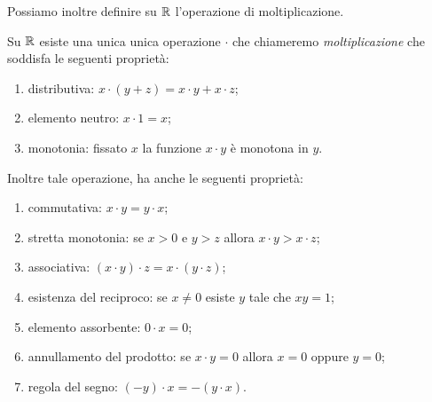 Possiamo inoltre definire su ${\mathbb R}$ l'operazione di moltiplicazione.
%
\begin{theorem}[moltiplicazione]
Su ${\mathbb R}$ esiste una unica unica operazione $\cdot$ che chiameremo 
\emph{moltiplicazione}%
%
 che soddisfa le seguenti 
proprietà: 
\begin{enumerate}
  \item distributiva: $x\cdot(y+z) = x\cdot y + x\cdot z$;
  \item elemento neutro: $x\cdot 1 = x$;
  \item monotonia: fissato $x$ la funzione $x\cdot y$ è monotona in $y$.  
\end{enumerate}
  Inoltre tale operazione,
  ha anche le seguenti proprietà:
\begin{enumerate}
  \item commutativa: $x\cdot y = y\cdot x$;
  \item stretta monotonia: se $x>0$ e $y>z$ allora $x\cdot y > x \cdot z$;
  \item associativa: $(x\cdot y)\cdot z = x \cdot (y\cdot z)$;
  \item esistenza del reciproco: se $x\neq 0$ esiste $y$ tale 
  che $xy = 1$;
  \item elemento assorbente: $0\cdot x = 0$;
  \item annullamento del prodotto: se $x\cdot y=0$ allora $x=0$ oppure $y=0$;
  \item regola del segno: $(-y)\cdot x = -(y\cdot x)$.
\end{enumerate}
\end{theorem}
%
